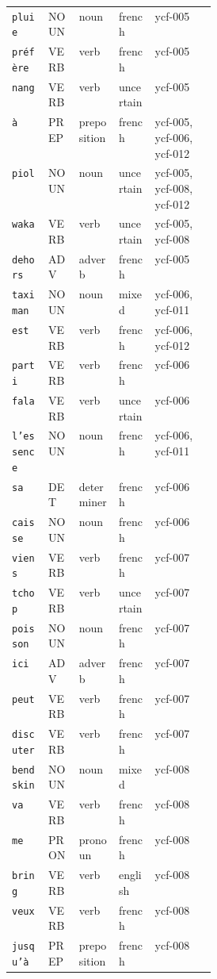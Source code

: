 \begin{longtable}{@{}llll p{0.30\linewidth}@{}}
\texttt{pluie} & NOUN & noun & french & \small ycf-005 \\
\texttt{préfère} & VERB & verb & french & \small ycf-005 \\
\texttt{nang} & VERB & verb & uncertain & \small ycf-005 \\
\texttt{à} & PREP & preposition & french & \small ycf-005, ycf-006, ycf-012 \\
\texttt{piol} & NOUN & noun & uncertain & \small ycf-005, ycf-008, ycf-012 \\
\texttt{waka} & VERB & verb & uncertain & \small ycf-005, ycf-008 \\
\texttt{dehors} & ADV & adverb & french & \small ycf-005 \\
\texttt{taximan} & NOUN & noun & mixed & \small ycf-006, ycf-011 \\
\texttt{est} & VERB & verb & french & \small ycf-006, ycf-012 \\
\texttt{parti} & VERB & verb & french & \small ycf-006 \\
\texttt{fala} & VERB & verb & uncertain & \small ycf-006 \\
\texttt{l'essence} & NOUN & noun & french & \small ycf-006, ycf-011 \\
\texttt{sa} & DET & determiner & french & \small ycf-006 \\
\texttt{caisse} & NOUN & noun & french & \small ycf-006 \\
\texttt{viens} & VERB & verb & french & \small ycf-007 \\
\texttt{tchop} & VERB & verb & uncertain & \small ycf-007 \\
\texttt{poisson} & NOUN & noun & french & \small ycf-007 \\
\texttt{ici} & ADV & adverb & french & \small ycf-007 \\
\texttt{peut} & VERB & verb & french & \small ycf-007 \\
\texttt{discuter} & VERB & verb & french & \small ycf-007 \\
\texttt{bendskin} & NOUN & noun & mixed & \small ycf-008 \\
\texttt{va} & VERB & verb & french & \small ycf-008 \\
\texttt{me} & PRON & pronoun & french & \small ycf-008 \\
\texttt{bring} & VERB & verb & english & \small ycf-008 \\
\texttt{veux} & VERB & verb & french & \small ycf-008 \\
\texttt{jusqu'à} & PREP & preposition & french & \small ycf-008 \\

\end{longtable}
